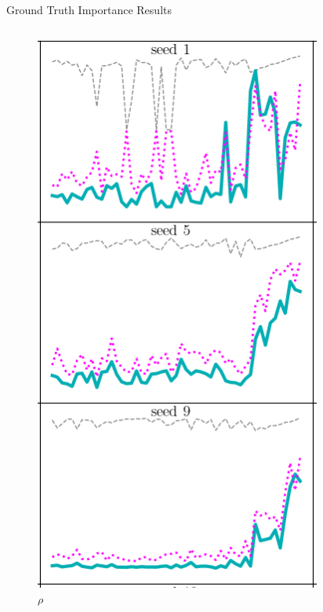 \documentclass[German, aspectratio=169]{beamer}
\begin{document}
\begin{frame}[t]{Ground Truth Importance Results}
\begin{columns}
\begin{column}[t]{0.3\textwidth}
\begin{figure}[t]
                \includegraphics[width=0.84\textwidth]{images/compare_seeds_mac_2.png}\\
                \vspace{-.3cm}
                $\rho$
            \end{figure}
        \end{column}
    \end{columns}
\end{frame}
\end{document}
